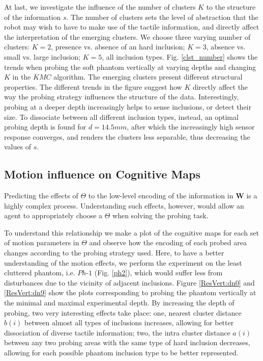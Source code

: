 At last, we investigate the influence of the number of clusters $K$ to the structure of the information $s$. 
The number of clusters sets the level of abstraction that the robot may wish to have to make use of the tactile 
information, and directly affect the interpretation of the emerging clusters. We choose three 
varying number of clusters: $K=2$, presence vs. absence of an hard inclusion; $K=3$, absence vs. small vs. large 
inclusion; $K=5$, all inclusion types. Fig. \ref{clst_number} shows the trends when probing the soft phantom 
vertically at varying depths and changing $K$ in the $KMC$ algorithm. The emerging 
clusters present different structural properties. The different trends in the figure suggest how $K$ directly 
affect the way the probing strategy influences the structure of the data. Interestingly, 
probing at a deeper depth increasingly helps to sense inclusions, or detect their size. 
To dissociate between all different inclusion types, instead, an optimal probing depth is found for $d=14.5mm$, 
after which the increasingly high sensor response converges, and renders the clusters less separable, thus 
decreasing the values of $s$.


\subsection{Motion influence on Cognitive Maps}

Predicting the effects of $\Theta$ to the low-level encoding of the information in $\mathbf{W}$ is a 
highly complex process. Understanding such effects, however, would allow an agent to appropriately choose
a $\Theta$ when solving the probing task.

To understand this relationship we make a plot of the cognitive maps for each set of motion parameters in $\Theta$ 
and observe how the encoding of each probed area changes according to the probing strategy used. Here, 
to have a better understanding of the motion effects, we perform the experiment on the least cluttered 
phantom, i.e. $Ph\text{-}1$ (Fig. \ref{ph2}), which would suffer less from disturbances due to the vicinity 
of adjacent inclusions. 
Figure \ref{ResVert:dn0} and \ref{ResVert:dn9} show the plots corresponding to probing the phantom 
vertically at the minimal and maximal experimental depth. By increasing the depth of probing, two very interesting 
effects take place: one, nearest cluster distance $b(i)$ between almost all types of inclusions increases, 
allowing for better dissociation of diverse tactile information; two, the intra cluster distance $a(i)$ 
between any two probing areas with the same type of hard inclusion decreases, allowing for each 
possible phantom inclusion type to be better represented. 

